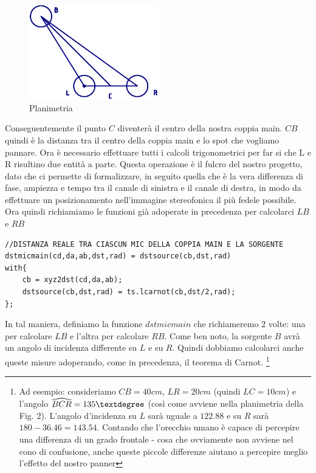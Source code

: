 \documentclass{article}
\begin{document}
    \begin{figure}[H]
        \centering
        \includegraphics[width=0.5\textwidth]{images/PLANIMETRIA.png}
         \caption{\label{fig2}Planimetria}
    \end{figure}

    Conseguentemente il punto $C$ diventerà il centro della nostra coppia main. $CB$ quindi è la distanza tra il centro della coppia main e lo spot che vogliamo pannare.
    Ora è necessario effettuare tutti i calcoli trigonometrici per far si che L e R risultino due entità a parte. Questa operazione è il fulcro del nostro progetto, dato che ci permette di formalizzare, in seguito quella che è la vera differenza di fase, ampiezza e tempo tra il canale di sinistra e il canale di destra, in modo da effettuare un posizionamento nell'immagine stereofonica il più fedele possibile.
    Ora quindi richiamiamo le funzioni già adoperate in precedenza per calcolarci $LB$ e $RB$ \\
    
    \begin{lstlisting}
//DISTANZA REALE TRA CIASCUN MIC DELLA COPPIA MAIN E LA SORGENTE
dstmicmain(cd,da,ab,dst,rad) = dstsource(cb,dst,rad)
with{
    cb = xyz2dst(cd,da,ab);
    dstsource(cb,dst,rad) = ts.lcarnot(cb,dst/2,rad);
};
    \end{lstlisting}
    
    In tal maniera, definiamo la funzione $dstmicmain$ che richiameremo 2 volte: una per calcolare $LB$ e l'altra per calcolare $RB$.
    Come ben noto, la sorgente $B$ avrà un angolo di incidenza differente su $L$ e su $R$. Quindi dobbiamo calcolarci anche queste misure adoperando, come in precedenza, il teorema di Carnot.
    \footnote{Ad esempio: consideriamo $CB = 40 cm$, $LR = 20cm$ (quindi $LC=10cm$) e l'angolo $\widehat{BCR} = 135\textdegree$ (così come avviene nella planimetria della Fig. 2). L'angolo d'incidenza su $L$ sarà uguale a $122.88$ e su $R$ sarà $180-36.46=143.54$. Contando che l'orecchio umano è capace di percepire una differenza di un grado frontale - cosa che ovviamente non avviene nel cono di confusione, anche queste piccole differenze aiutano a percepire meglio l'effetto del nostro panner}
    
\end{document}
